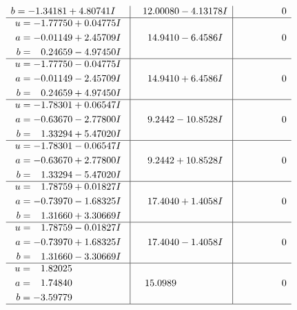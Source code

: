 \documentclass[1p]{elsarticle_modified}
\theoremstyle{definition}
\begin{document}
$$\begin{array}{c|c|c}
\begin{aligned}
b &= -1.34181 + 4.80741 I\end{aligned}
 & \phantom{-}12.00080 - 4.13178 I & \phantom{-0.000000 } 0 \\ \hline\begin{aligned}
u &= -1.77750 + 0.04775 I \\
a &= -0.01149 + 2.45709 I \\
b &= \phantom{-}0.24659 - 4.97450 I\end{aligned}
 & \phantom{-}14.9410 - 6.4586 I & \phantom{-0.000000 } 0 \\ \hline\begin{aligned}
u &= -1.77750 - 0.04775 I \\
a &= -0.01149 - 2.45709 I \\
b &= \phantom{-}0.24659 + 4.97450 I\end{aligned}
 & \phantom{-}14.9410 + 6.4586 I & \phantom{-0.000000 } 0 \\ \hline\begin{aligned}
u &= -1.78301 + 0.06547 I \\
a &= -0.63670 - 2.77800 I \\
b &= \phantom{-}1.33294 + 5.47020 I\end{aligned}
 & \phantom{-}9.2442 - 10.8528 I & \phantom{-0.000000 } 0 \\ \hline\begin{aligned}
u &= -1.78301 - 0.06547 I \\
a &= -0.63670 + 2.77800 I \\
b &= \phantom{-}1.33294 - 5.47020 I\end{aligned}
 & \phantom{-}9.2442 + 10.8528 I & \phantom{-0.000000 } 0 \\ \hline\begin{aligned}
u &= \phantom{-}1.78759 + 0.01827 I \\
a &= -0.73970 - 1.68325 I \\
b &= \phantom{-}1.31660 + 3.30669 I\end{aligned}
 & \phantom{-}17.4040 + 1.4058 I & \phantom{-0.000000 } 0 \\ \hline\begin{aligned}
u &= \phantom{-}1.78759 - 0.01827 I \\
a &= -0.73970 + 1.68325 I \\
b &= \phantom{-}1.31660 - 3.30669 I\end{aligned}
 & \phantom{-}17.4040 - 1.4058 I & \phantom{-0.000000 } 0 \\ \hline\begin{aligned}
u &= \phantom{-}1.82025\phantom{ +0.000000I} \\
a &= \phantom{-}1.74840\phantom{ +0.000000I} \\
b &= -3.59779\phantom{ +0.000000I}\end{aligned}
 & \phantom{-}15.0989\phantom{ +0.000000I} & \phantom{-0.000000 } 0\\
 \hline 
 \end{array}$$\newpage\newpage\renewcommand{\arraystretch}{1}
\end{document}
